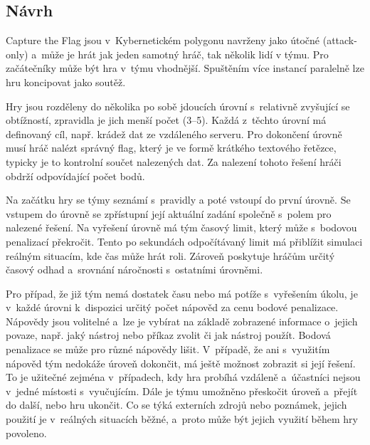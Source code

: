 \documentclass[
  digital, %
  oneside, %
  table,   %
  nolof,     %
  nolot,     %
]{fithesis3}
\begin{document}
\subsection{Návrh} \label{gameDesign}
Capture the Flag jsou v~Kybernetickém polygonu navrženy jako útočné (attack-only) a~může je hrát jak jeden samotný hráč, tak několik lidí v týmu. Pro začátečníky může být hra v~týmu vhodnější. Spuštěním více instancí paralelně lze hru koncipovat jako soutěž.\par
Hry jsou rozděleny do několika po sobě jdoucích úrovní s~relativně zvyšující se obtížností, zpravidla je jich menší počet (3–5). Každá z~těchto úrovní má definovaný cíl, např. krádež dat ze vzdáleného serveru. Pro dokončení úrovně musí hráč nalézt správný flag, který je ve formě krátkého textového řetězce, typicky je to kontrolní součet nalezených dat. Za nalezení tohoto řešení hráči obdrží odpovídající počet bodů.\par
Na začátku hry se týmy seznámí s~pravidly a poté vstoupí do první úrovně. Se vstupem do úrovně se zpřístupní její aktuální zadání společně s~polem pro nalezené řešení. Na vyřešení úrovně má tým časový limit, který může s~bodovou penalizací překročit. Tento po sekundách odpočítávaný limit má přiblížit simulaci reálným situacím, kde čas může hrát roli. Zároveň poskytuje hráčům určitý časový odhad a~srovnání náročnosti s~ostatními úrovněmi.\par
Pro případ, že již tým nemá dostatek času nebo má potíže s~vyřešením úkolu, je v~každé úrovni k~dispozici určitý počet nápověd za cenu bodové penalizace. Nápovědy jsou volitelné a~lze je vybírat na základě zobrazené informace o~jejich povaze, např. jaký nástroj nebo příkaz zvolit či jak nástroj použít. Bodová penalizace se může pro různé nápovědy lišit. V~případě, že ani s~využitím nápověd tým nedokáže úroveň dokončit, má ještě možnost zobrazit si její řešení. To je užitečné zejména v~případech, kdy hra probíhá vzdáleně a~účastníci nejsou v~jedné místosti s~vyučujícím. Dále je týmu umožněno přeskočit úroveň a~přejít do další, nebo hru ukončit. Co se týká externích zdrojů nebo poznámek, jejich použití je v~reálných situacích běžné, a~proto může být jejich využití během hry povoleno. \cite{ctfDesign}\par
\end{document}
